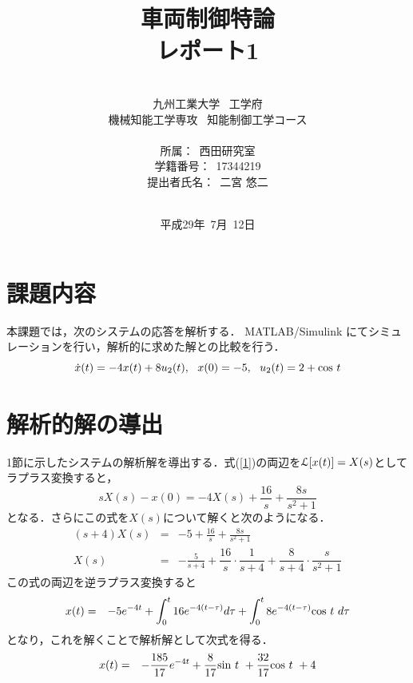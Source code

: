 \documentclass[a4paper,12pt]{jarticle}
\title{\vspace{5mm}\\
\Large{車両制御特論\\レポート1\\}
}
\author{\vspace{80mm}\\
九州工業大学\ \hspace{0mm} 工学府\\
機械知能工学専攻\ \hspace{0mm} 知能制御工学コース\\
\\
所属：\ 西田研究室\\
学籍番号：\ 17344219\\
提出者氏名：\ 二宮 \hspace{0mm} 悠二\\\vspace{5mm}\\}
\date{平成29年\ 7月\ 12日}
\begin{document}
\titlepage
\maketitle
\thispagestyle{empty}
\newpage
\thispagestyle{empty}
\tableofcontents
\newpage
\section{課題内容}
本課題では，次のシステムの応答を解析する．
MATLAB/Simulink にてシミュレーションを行い，解析的に求めた解との比較を行う．
\begin{equation}
 \dot{x}(t) = -4 x(t) + 8 u_2(t), ~~ x(0) = -5, ~~ u_2(t) = 2 + {\rm cos} ~ t
\label{1}
\end{equation}
\section{解析的解の導出}
1節に示したシステムの解析解を導出する．式(\ref{1})の両辺を$ {\cal L}[x(t)] = X(s) $としてラプラス変換すると，
\begin{equation}
 sX(s) - x(0) = -4X(s) + \frac{16}{s} + \frac{8s}{s^2+1} 
\end{equation}
となる．さらにこの式を$ X(s) $について解くと次のようになる．
\begin{eqnarray}
 (s + 4)X(s) & = & -5 + \frac{16}{s} +\frac{8s}{s^2+1} \nonumber\\
        X(s) & = & - \frac{5}{s+4} + \dfrac{16}{s} \cdot \dfrac{1}{s+4} + \dfrac{8}{s+4} \cdot \dfrac{s}{s^2+1} 
\end{eqnarray}
この式の両辺を逆ラプラス変換すると
\begin{eqnarray}
 x(t) & = & -5e^{-4t} + \int_0^t {16e^{-4(t-\tau)}} d\tau + \int_0^t {8e^{-4(t-\tau)} {\rm cos} ~ t ~} d\tau 
\end{eqnarray}
となり，これを解くことで解析解として次式を得る．
\begin{eqnarray}
 x(t) & = & - \dfrac{185}{17}e^{-4t} + \dfrac{8}{17}{\rm sin}~t~ + \dfrac{32}{17}{\rm cos}~t~ + 4
\end{eqnarray}
\end{document}
